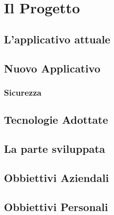 
\chapter{Il Progetto}
\label{cap:progetto}




\section{L'applicativo attuale}

\section{Nuovo Applicativo}
	
	\subsection{Sicurezza}

\section{Tecnologie Adottate}
	
\section{La parte sviluppata}

\section{Obbiettivi Aziendali}

\section{Obbiettivi Personali}
